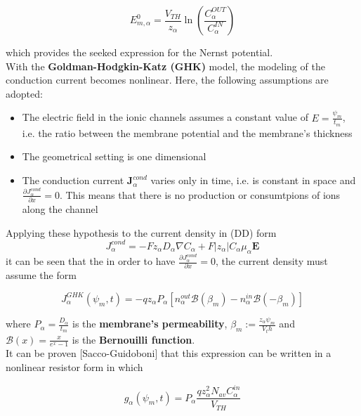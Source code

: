 \documentclass[a4paper]{article}
\begin{document}
\begin{equation}
E_{m,\alpha}^0 = \frac{V_{TH}}{z_{\alpha}}\ln\left(\frac{C_{\alpha}^{OUT}}{C_{\alpha}^{IN}}\right)
\end{equation}

which provides the seeked expression for the Nernst potential.
\\

With the \textbf{Goldman-Hodgkin-Katz (GHK)} model, the modeling of the conduction current becomes nonlinear. Here, the following assumptions are adopted: 

\begin{itemize}
	
	\item The electric field in the ionic channels assumes a constant value of $ E = \frac{\psi_m}{t_m}$, i.e. the ratio between the membrane potential and the membrane's thickness
	
	\item The geometrical setting is one dimensional
	
	\item The conduction current $\textbf{J}_{\alpha}^{cond}$ varies only in time, i.e. is constant in space and $ \frac{\partial J_{\alpha}^{cond} }{\partial x} = 0$. This means that there is no production or consumtpions of ions along the channel
	
\end{itemize}

Applying these hypothesis to the current density in (DD) form 
$$ J_{\alpha}^{cond} =  -Fz_{\alpha}D_{\alpha}\nabla C_{\alpha} + F|z_{\alpha}| C_{\alpha}\mu_{\alpha}\textbf{E} $$
it can be seen that the in order to have $ \frac{\partial J_{\alpha}^{cond} }{\partial x} = 0$, the current density must assume the form

\begin{equation}
J_{\alpha}^{GHK}(\psi_m,t) = -qz_{\alpha}P_{\alpha}\left[n_{\alpha}^{out} \mathcal{B}(\beta_m) - n_{\alpha}^{in} \mathcal{B}(-\beta_m) \right]
\end{equation}

where $P_{\alpha} = \frac{D_{\alpha}}{t_m}$ is the \textbf{membrane's permeability}, $ \beta_m := \frac{z_{\alpha} \psi_m}{V_th}$ and $ \mathcal{B}(x) = \frac{x}{e^x -1}$ is the \textbf{Bernouilli function}.\\
It can be proven [Sacco-Guidoboni] that this expression can be written in a nonlinear resistor form in which

\begin{equation}
g_{\alpha}(\psi_m,t) = P_{\alpha}\frac{q z_{\alpha}^2N_{av}C_{\alpha}^{in}}{V_{TH}} 
\end{equation}
\end{document}
